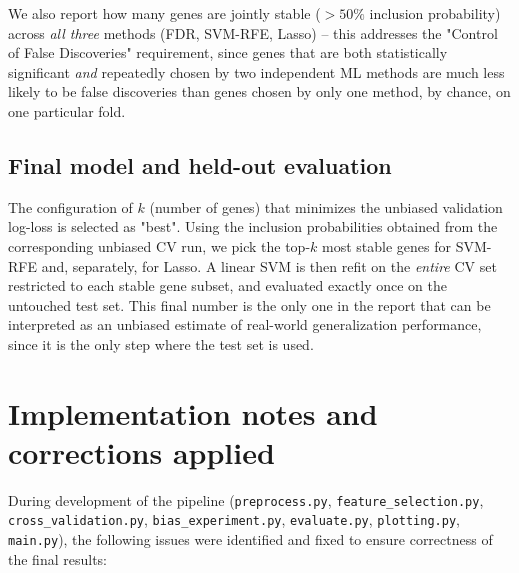 \documentclass[11pt,a4paper]{article}
\begin{document}
We also report how many genes are jointly stable ($>50\%$ inclusion probability) across \emph{all three} methods (FDR, SVM-RFE, Lasso) -- this addresses the "Control of False Discoveries" requirement, since genes that are both statistically significant \emph{and} repeatedly chosen by two independent ML methods are much less likely to be false discoveries than genes chosen by only one method, by chance, on one particular fold.

\subsection{Final model and held-out evaluation}
The configuration of $k$ (number of genes) that minimizes the unbiased validation log-loss is selected as "best".
Using the inclusion probabilities obtained from the corresponding unbiased CV run, we pick the top-$k$ most stable genes for SVM-RFE and, separately, for Lasso. A linear SVM is then refit on the \emph{entire} CV set restricted to each stable gene subset, and evaluated exactly once on the untouched test set.
This final number is the only one in the report that can be interpreted as an unbiased estimate of real-world generalization performance, since it is the only step where the test set is used.

\section{Implementation notes and corrections applied}
During development of the pipeline (\texttt{preprocess.py}, \texttt{feature\_selection.py}, \texttt{cross\_validation.py}, \texttt{bias\_experiment.py}, \texttt{evaluate.py}, \texttt{plotting.py}, \texttt{main.py}), the following issues were identified and fixed to ensure correctness of the final results:
\end{document}
